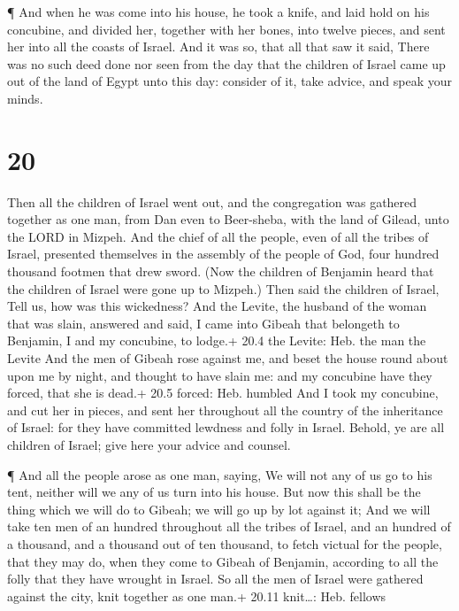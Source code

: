  ¶ And when he was come into his house, he took a knife,
and laid hold on his concubine, and divided her, together with her
bones, into twelve pieces, and sent her into all the coasts of Israel.
 And it was so, that all that saw it said, There was no
such deed done nor seen from the day that the children of Israel came up
out of the land of Egypt unto this day: consider of it, take advice, and
speak your minds.

\hypertarget{section-19}{%
\section{20}\label{section-19}}

 Then all the children of Israel went out, and the
congregation was gathered together as one man, from Dan even to
Beer-sheba, with the land of Gilead, unto the LORD in Mizpeh.
 And the chief of all the people, even of all the tribes of
Israel, presented themselves in the assembly of the people of God, four
hundred thousand footmen that drew sword.  (Now the children
of Benjamin heard that the children of Israel were gone up to Mizpeh.)
Then said the children of Israel, Tell us, how was this wickedness?
 And the Levite, the husband of the woman that was slain,
answered and said, I came into Gibeah that belongeth to Benjamin, I and
my concubine, to lodge.+ 20.4 the Levite: Heb. the man the Levite
 And the men of Gibeah rose against me, and beset the house
round about upon me by night, and thought to have slain me: and my
concubine have they forced, that she is dead.+ 20.5 forced: Heb. humbled
 And I took my concubine, and cut her in pieces, and sent
her throughout all the country of the inheritance of Israel: for they
have committed lewdness and folly in Israel.  Behold, ye are
all children of Israel; give here your advice and counsel.

 ¶ And all the people arose as one man, saying, We will not
any of us go to his tent, neither will we any of us turn into his house.
 But now this shall be the thing which we will do to Gibeah;
we will go up by lot against it;  And we will take ten men
of an hundred throughout all the tribes of Israel, and an hundred of a
thousand, and a thousand out of ten thousand, to fetch victual for the
people, that they may do, when they come to Gibeah of Benjamin,
according to all the folly that they have wrought in Israel.
 So all the men of Israel were gathered against the city,
knit together as one man.+ 20.11 knit\ldots: Heb. fellows


